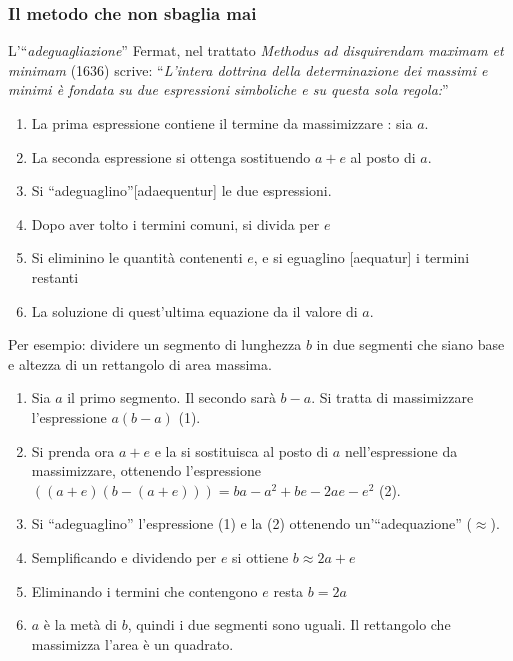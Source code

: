 \begin{frame}[label=Fermat-metodo]
    \frametitle{Il metodo che non sbaglia mai}
    \begin{block}{L'``\textit{adeguagliazione}''}
        Fermat, nel trattato \textit{Methodus ad disquirendam maximam et minimam} (1636) scrive:
        ``\textit{L'intera dottrina della determinazione dei massimi e minimi è
        fondata su due espressioni simboliche e su questa sola regola:}''
        \begin{enumerate}
        \item<1-> La prima espressione contiene il termine da massimizzare : sia $a$.
        \item<2-> La seconda espressione si ottenga sostituendo $a+e$ al posto di $a$.
        \item<3-> Si ``\alert{adeguaglino}''[adaequentur] le due espressioni.
        \item<4-> Dopo aver tolto i termini comuni, si divida per $e$
        \item<5-> Si eliminino le quantità contenenti $e$, e si eguaglino [aequatur] i termini restanti
        \item<6-> La soluzione di quest'ultima equazione da il valore di $a$.
        \end{enumerate}
        \pause
    Per esempio: dividere un segmento di lunghezza $b$ in due segmenti che siano base e altezza 
    di un rettangolo di area massima.\\
    \begin{enumerate}
        \item Sia $a$ il primo segmento. Il secondo sarà $b-a$. Si tratta di massimizzare l'espressione $a(b-a)$ (1).
        \item Si prenda ora $a+e$ e la si sostituisca al posto di $a$ nell'espressione da massimizzare, ottenendo
    l'espressione $((a+e)(b-(a+e))) = ba - a^2 +be -2ae -e^2$ (2).
    \item Si ``\alert{adeguaglino}'' l'espressione (1) e la (2) ottenendo un'``\alert{adequazione}'' ($\approx$).
    \item Semplificando e dividendo per $e$ si ottiene $b \approx 2a + e$
    \item Eliminando i termini che contengono $e$ resta $b = 2a$ 
    \item $a$ è la metà di $b$, quindi i due segmenti sono uguali. Il rettangolo che massimizza l'area è un quadrato.    
    \end{enumerate}
    
\end{block}
\end{frame}